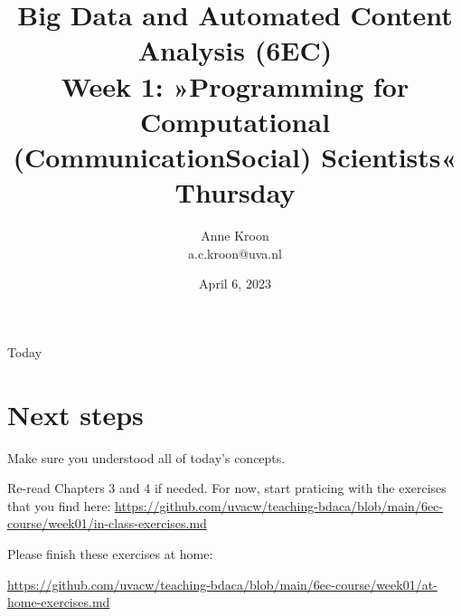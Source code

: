 

\graphicspath{{../../resources/img/}}




\title[Big Data and Automated Content Analysis]{\textbf{Big Data and Automated Content Analysis (6EC)} 
\\Week 1: »Programming for Computational (Communication\textbar Social) Scientists«
\\Thursday }
\author[Anne Kroon]{Anne Kroon\\ \footnotesize{a.c.kroon@uva.nl}}
\date{April 6, 2023}

\begin{frame}{}
	\titlepage
\end{frame}

\begin{frame}{Today}
	\tableofcontents
\end{frame}






\section{Next steps}


\begin{frame}[standout]
Make sure you understood all of today's concepts.

Re-read Chapters 3 and 4 if needed.
For now, start praticing with the exercises that you find here:
\large{\url{https://github.com/uvacw/teaching-bdaca/blob/main/6ec-course/week01/in-class-exercises.md}}

Please finish these exercises at home: 

\large{\url{https://github.com/uvacw/teaching-bdaca/blob/main/6ec-course/week01/at-home-exercises.md}}
\end{frame}


\begin{frame}
	\printbibliography
\end{frame}


